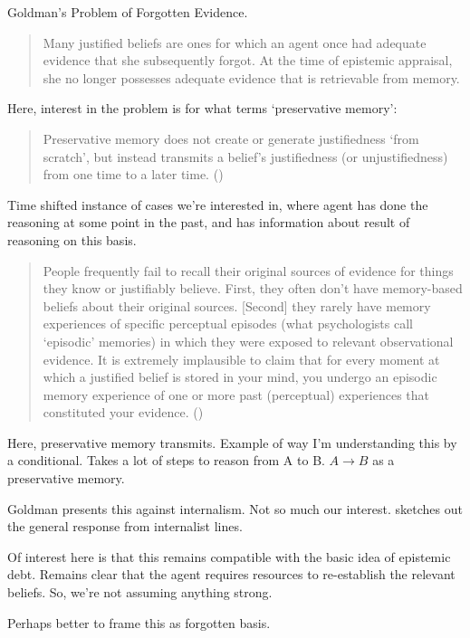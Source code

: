 \begin{note}
  Goldman's Problem of Forgotten Evidence.

  \begin{quote}
    Many justified beliefs are ones for which an agent once had adequate evidence that she subsequently forgot. At the time of epistemic appraisal, she no longer possesses adequate evidence that is retrievable from memory.
  \end{quote}

  Here, interest in the problem is for what \citeauthor{Goldman:2011vn} terms `preservative memory':
  \begin{quote}
    Preservative memory does not create or generate justifiedness `from scratch', but instead transmits a belief's justifiedness (or unjustifiedness) from one time to a later time.\nolinebreak
    \mbox{}\hfill\mbox{(\citeyear[259--260]{Goldman:2011vn})}
  \end{quote}
  Time shifted instance of cases we're interested in, where agent has done the reasoning at some point in the past, and has information about result of reasoning on this basis.

  \begin{quote}
    People frequently fail to recall their original sources of evidence for things they know or justiﬁably believe.
    First, they often don’t have memory-based beliefs about their original sources.
    [Second] they rarely have memory experiences of speciﬁc perceptual episodes (what psychologists call `episodic' memories) in which they were exposed to relevant observational evidence.
    It is extremely implausible to claim that for every moment at which a justiﬁed belief is stored in your mind, you undergo an episodic memory experience of one or more past (perceptual) experiences that constituted your evidence.\nolinebreak
    \mbox{}\hfill\mbox{(\citeyear[266--267]{Goldman:2011vn})}
  \end{quote}

  Here, preservative memory transmits.
  Example of way I'm understanding this by a conditional.
  Takes a lot of steps to reason from A to B.
  \(A \rightarrow B\) as a preservative memory.

  Goldman presents this against internalism.
  Not so much our interest.
  \cite{Korcz:2019tl} sketches out the general response from internalist lines.
  
  Of interest here is that this remains compatible with the basic idea of epistemic debt.
  Remains clear that the agent requires resources to re-establish the relevant beliefs.
  So, we're not assuming anything strong.

  Perhaps better to frame this as forgotten basis.
\end{note}


